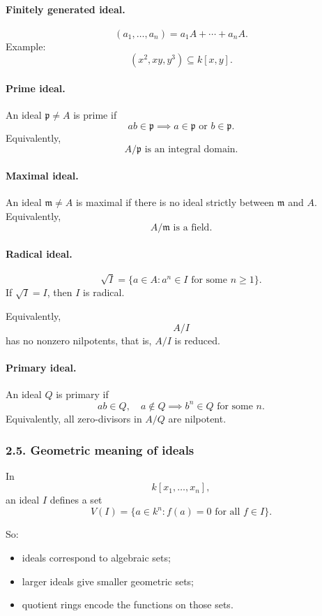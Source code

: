 \documentclass[12pt,a4paper]{article}
\theoremstyle{plain}
\theoremstyle{definition}      %
\begin{document}
	\paragraph{Finitely generated ideal.}
	\[
	(a_1,\dots,a_n)=a_1A+\cdots+a_nA.
	\]
	Example:
	\[
	(x^2,xy,y^3)\subseteq k[x,y].
	\]
	
	\paragraph{Prime ideal.}
	An ideal \(\mathfrak p\neq A\) is prime if
	\[
	ab\in \mathfrak p\implies a\in \mathfrak p\text{ or }b\in \mathfrak p.
	\]
	Equivalently,
	\[
	A/\mathfrak p\text{ is an integral domain.}
	\]
	
	\paragraph{Maximal ideal.}
	An ideal \(\mathfrak m\neq A\) is maximal if there is no ideal strictly between \(\mathfrak m\) and \(A\).
	Equivalently,
	\[
	A/\mathfrak m\text{ is a field.}
	\]
	
	\paragraph{Radical ideal.}
	\[
	\sqrt I=\{a\in A:a^n\in I\text{ for some }n\ge 1\}.
	\]
	If \(\sqrt I=I\), then \(I\) is radical.
	
	Equivalently,
	\[
	A/I
	\]
	has no nonzero nilpotents, that is, \(A/I\) is reduced.
	
	\paragraph{Primary ideal.}
	An ideal \(Q\) is primary if
	\[
	ab\in Q,\quad a\notin Q \implies b^n\in Q\text{ for some }n.
	\]
	Equivalently, all zero-divisors in \(A/Q\) are nilpotent.
	
	\subsubsection*{2.5. Geometric meaning of ideals}
	
	In
	\[
	k[x_1,\dots,x_n],
	\]
	an ideal \(I\) defines a set
	\[
	V(I)=\{a\in k^n:f(a)=0\text{ for all }f\in I\}.
	\]
	
	So:
	\begin{itemize}
		\item ideals correspond to algebraic sets;
		\item larger ideals give smaller geometric sets;
		\item quotient rings encode the functions on those sets.
	\end{itemize}
	
\end{document}
